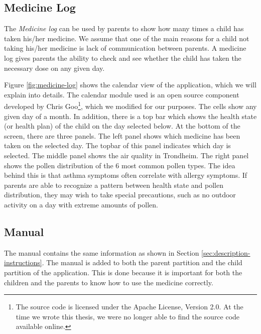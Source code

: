 \subsection{Medicine Log}
\label{sec:description-medicine-log}
The \emph{Medicine log} can be used by parents to show how many times a child has taken his/her medicine. We assume that one of the main reasons for a child not taking his/her medicine is lack of communication between parents. A medicine log gives parents the ability to check and see whether the child has taken the necessary dose on any given day.


Figure \ref{fig:medicine-log} shows the calendar view of the application, which we will explain into details. The calendar module used is an open source component developed by Chris Goo\footnote{The source code is licensed under the Apache License, Version 2.0. At the time we wrote this thesis, we were no longer able to find the source code available online.}, which we modified for our purposes. The cells show any given day of a month. In addition, there is a top bar which shows the health state (or health plan) of the child on the day selected below. At the bottom of the screen, there are three panels. The left panel shows which medicine has been taken on the selected day. The topbar of this panel indicates which day is selected. The middle panel shows the air quality in Trondheim. The right panel shows the pollen distribution of the 6 most common pollen types. The idea behind this is that asthma symptoms often correlate with allergy symptoms. If parents are able to recognize a pattern between health state and pollen distribution, they may wish to take special precautions, such as no outdoor activity on a day with extreme amounts of pollen.    


\subsection{Manual}
\label{sec:description-manual}
The manual contains the same information as shown in Section \ref{sec:description-instructions}. The manual is added to both the parent partition and the child partition of the application. This is done because it is important for both the children and the parents to know how to use the medicine correctly. 


